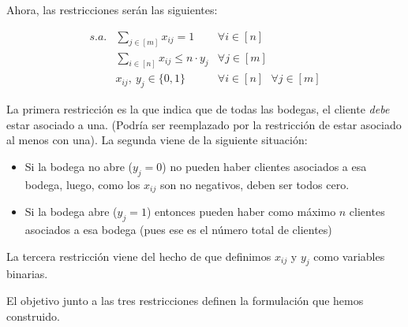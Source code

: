 \begin{eje}
Ahora, las restricciones serán las siguientes:

\begin{equation*}
    \begin{array}{rll}
        s.a.&\sum\limits_{j\in[m]}x_{ij}=1&\forall i \in [n]\\
        &\sum\limits_{i\in [n]}x_{ij}\leq n\cdot y_j&\forall j \in [m]\\
        &x_{ij},\ y_{j}\in\{0,1\}&\forall i\in[n]\text{ }\forall j\in[m]
    \end{array}
\end{equation*}

La primera restricción es la que indica que de todas las bodegas, el cliente \emph{debe} estar asociado a una. (Podría ser reemplazado por la restricción de estar asociado al menos con una). La segunda viene de la siguiente situación:
\begin{itemize}
    \item Si la bodega no abre ($y_j=0$) no pueden haber clientes asociados a esa bodega, luego, como los $x_{ij}$ son no negativos, deben ser todos cero.
    \item Si la bodega abre ($y_j=1$) entonces pueden haber como máximo $n$ clientes asociados a esa bodega (pues ese es el número total de clientes)
\end{itemize}
La tercera restricción viene del hecho de que definimos $x_{ij}$ y $y_j$ como variables binarias. 

El objetivo junto a las tres restricciones definen la formulación que hemos construido.
\end{eje}


